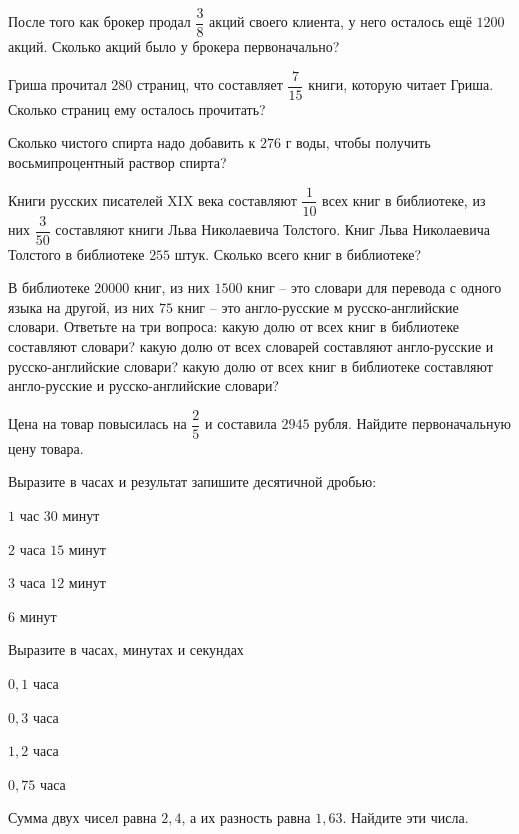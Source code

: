 \begin{class}[number=5]
	\begin{listofex}
		\item После того как брокер продал \( \dfrac{3}{8} \) акций своего клиента, у него осталось ещё \(1200\) акций. Сколько акций было у брокера первоначально?
		\item Гриша прочитал \(280\) страниц, что составляет \(\dfrac{7}{15}\) книги, которую читает Гриша. Сколько страниц ему осталось прочитать?
		\item Сколько чистого спирта надо добавить к \(276\) г воды, чтобы получить восьмипроцентный раствор спирта?
		\item Книги русских писателей XIX века составляют \(\dfrac{1}{10}\) всех книг в библиотеке, из них \(\dfrac{3}{50}\) составляют книги Льва Николаевича Толстого. Книг Льва Николаевича Толстого в библиотеке \(255\) штук. Сколько всего книг в библиотеке?
		\item В библиотеке \(20000\) книг, из них \(1500\) книг – это словари для перевода с одного языка на другой, из них \(75\) книг – это англо-русские м русско-английские словари. Ответьте на три вопроса: какую долю от всех книг в библиотеке составляют словари? какую долю от всех словарей составляют англо-русские и русско-английские словари? какую долю от всех книг в библиотеке составляют англо-русские и русско-английские словари?
		\item Цена на товар повысилась на \(\dfrac{2}{5}\) и составила \(2945\) рубля. Найдите первоначальную цену товара.
		\item Выразите в часах и результат запишите десятичной дробью:
		\begin{enumcols}[itemcolumns=4]
			\item \(1\) час \(30\) минут
			\item \(2\) часа \(15\) минут
			\item \(3\) часа \(12\) минут
			\item \(6\) минут
		\end{enumcols}
		\item Выразите в часах, минутах и секундах
		\begin{enumcols}[itemcolumns=4]
			\item \(0,1\) часа
			\item \(0,3\) часа
			\item \(1,2\) часа
			\item \(0,75\) часа
		\end{enumcols}
		\item Сумма двух чисел равна \(2,4\), а их разность равна \(1,63\). Найдите эти числа.

\end{listofex}
\end{class}
